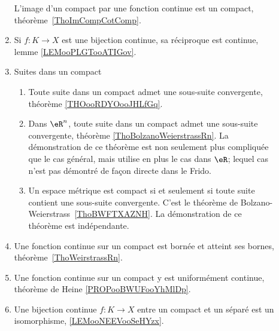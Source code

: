 \begin{description}
\begin{enumerate}
			      L'image d'un compact par une fonction continue est un compact, théorème~\ref{ThoImCompCotComp}.
			\item
			      Si \( f\colon K\to X\) est une bijection continue, sa réciproque est continue, lemme \ref{LEMooPLGTooATIGov}.
			\item
			      Suites dans un compact
			      \begin{enumerate}
				      \item
				            Toute suite dans un compact admet une sous-suite convergente, théorème \ref{THOooRDYOooJHLfGq}.
				      \item
				            Dans \( \eR^n\), toute suite dans un compact admet une sous-suite convergente, théorème \ref{ThoBolzanoWeierstrassRn}. La démonstration de ce théorème est non seulement plus compliquée que le cas général, mais utilise en plus le cas dans \( \eR\); lequel cas n'est pas démontré de façon directe dans le Frido.
				      \item
				            Un espace métrique est compact si et seulement si toute suite contient une sous-suite convergente. C'est le théorème de Bolzano-Weierstrass~\ref{ThoBWFTXAZNH}. La démonstration de ce théorème est indépendante.
			      \end{enumerate}
			\item
			      Une fonction continue sur un compact est bornée et atteint ses bornes, théorème~\ref{ThoWeirstrassRn}.
			\item
			      Une fonction continue sur un compact y est uniformément continue, théorème de Heine \ref{PROPooBWUFooYhMlDp}.
			\item
			      Une bijection continue \( f\colon K\to X\) entre un compact et un séparé est un isomorphisme, \ref{LEMooNEEVooSeHYzx}.
		\end{enumerate}


\end{description}
